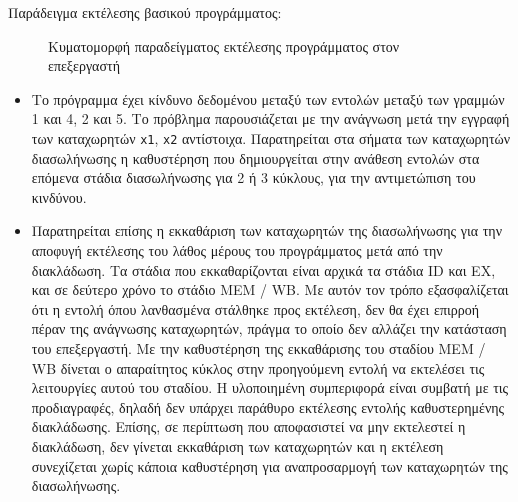 \documentclass[11pt]{extarticle}
\begin{document}
\newpage
Παράδειγμα εκτέλεσης βασικού προγράμματος:
\begin{figure}[H]
\centering
\renewcommand{\figurename}{Κυματομορφή} 
\caption[Κυματομορφή - Παράδειγμα Εκτέλεσης Προγράμματος]{Κυματομορφή παραδείγματος εκτέλεσης προγράμματος στον επεξεργαστή}
\end{figure}

\begin{itemize}
    \item Το πρόγραμμα έχει κίνδυνο δεδομένου μεταξύ των εντολών μεταξύ των γραμμών 1 και 4, 2 και 5.
    Το πρόβλημα παρουσιάζεται με την ανάγνωση μετά την εγγραφή των καταχωρητών \texttt{x1}, \texttt{x2} αντίστοιχα.
    Παρατηρείται στα σήματα των καταχωρητών διασωλήνωσης η καθυστέρηση που δημιουργείται στην ανάθεση εντολών στα επόμενα στάδια διασωλήνωσης για 2 ή 3 κύκλους, για την αντιμετώπιση του κινδύνου.
    \item Παρατηρείται επίσης η εκκαθάριση των καταχωρητών της διασωλήνωσης για την αποφυγή εκτέλεσης του λάθος μέρους του προγράμματος μετά από την διακλάδωση.
    Τα στάδια που εκκαθαρίζονται είναι αρχικά τα στάδια ID και EX, και σε δεύτερο χρόνο το στάδιο MEM / WB.
    Με αυτόν τον τρόπο εξασφαλίζεται ότι η εντολή όπου λανθασμένα στάλθηκε προς εκτέλεση, δεν θα έχει επιρροή πέραν της ανάγνωσης καταχωρητών, πράγμα το οποίο δεν αλλάζει την κατάσταση του επεξεργαστή.
    Με την καθυστέρηση της εκκαθάρισης του σταδίου MEM / WB δίνεται ο απαραίτητος κύκλος στην προηγούμενη εντολή να εκτελέσει τις λειτουργίες αυτού του σταδίου.
    Η υλοποιημένη συμπεριφορά είναι συμβατή με τις προδιαγραφές, δηλαδή δεν υπάρχει παράθυρο εκτέλεσης εντολής καθυστερημένης διακλάδωσης.
    Επίσης, σε περίπτωση που αποφασιστεί να μην εκτελεστεί η διακλάδωση, δεν γίνεται εκκαθάριση των καταχωρητών και η εκτέλεση συνεχίζεται χωρίς κάποια καθυστέρηση για αναπροσαρμογή των καταχωρητών της διασωλήνωσης.
\end{itemize}
\end{document}
